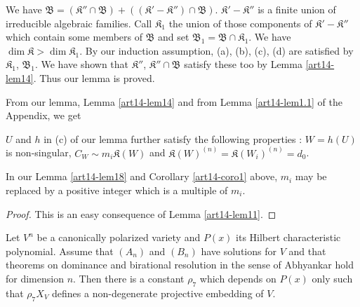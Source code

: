 We have $\mathfrak{B}=(\mathfrak{K}''\cap \mathfrak{B})+((\mathfrak{K}'-\mathfrak{K}'')\cap \mathfrak{B})$. $\mathfrak{K}'-\mathfrak{K}''$ is a finite union of irreducible algebraic families. Call $\mathfrak{K}_{1}$ the union of those components of $\mathfrak{K}'-\mathfrak{K}''$ which contain some members of $\mathfrak{B}$ and set $\mathfrak{B}_{1}=\mathfrak{B}\cap \mathfrak{K}_{1}$. We have $\dim \mathfrak{K}>\dim \mathfrak{K}_{1}$. By our induction assumption, (a), (b), (c), (d) are satisfied by $\mathfrak{K}_{1}$, $\mathfrak{B}_{1}$. We have shown that $\mathfrak{K}''$, $\mathfrak{K}''\cap \mathfrak{B}$ satisfy these too by Lemma \ref{art14-lem14}. Thus our lemma is proved.

From our lemma, Lemma \ref{art14-lem14} and from Lemma \ref{art14-lem1.1} of the Appendix, we get

\begin{corollary}\label{art14-coro1}
$U$ and $h$ in {\rm(c)} of our lemma further satisfy the following properties : $W=h(U)$ is non-singular, $C_{W}\sim m_{i}\mathfrak{K}(W)$ and $\mathfrak{K}(W)^{(n)}=\mathfrak{K}(W_{i})^{(n)}=d_{0}$.
\end{corollary}

\begin{corollary}\label{art14-coro2}
In our Lemma \ref{art14-lem18} and Corollary \ref{art14-coro1} above, $m_{i}$ may be replaced by a positive integer which is a multiple of $m_{i}$.
\end{corollary}

\begin{proof}
This is an easy consequence of Lemma \ref{art14-lem11}.
\end{proof}

\begin{theorem}\label{art14-thm2}
Let $V^{n}$ be a canonically polarized variety and $P(x)$ its Hilbert characteristic polynomial. Assume that $(A_{n})$ and $(B_{n})$ have solutions for $V$ and that theorems on dominance and birational resolution in the sense of Abhyankar hold for dimension $n$. Then there is a constant $\rho_{7}$ which depends on $P(x)$ only such that $\rho_{7}X_{V}$ defines a non-degenerate projective embedding of $V$.
\end{theorem}

